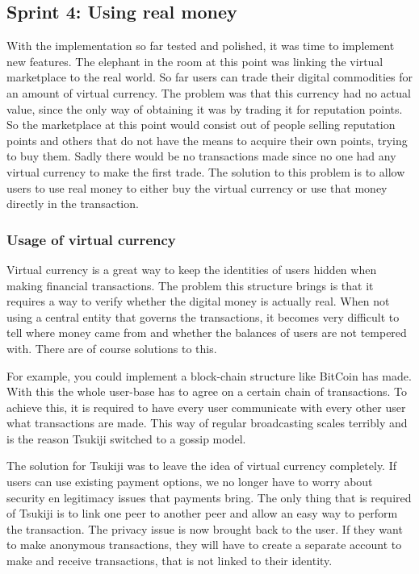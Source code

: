 \subsection{Sprint 4: Using real money}
With the implementation so far tested and polished, it was time to implement new features. 
The elephant in the room at this point was linking the virtual marketplace to the real world.
So far users can trade their digital commodities for an amount of virtual currency.
The problem was that this currency had no actual value, since the only way of obtaining it was by trading it for reputation points.
So the marketplace at this point would consist out of people selling reputation points and others that do not have the means to acquire their own points, trying to buy them.
Sadly there would be no transactions made since no one had any virtual currency to make the first trade.
The solution to this problem is to allow users to use real money to either buy the virtual currency or use that money directly in the transaction.
\subsubsection{Usage of virtual currency}
Virtual currency is a great way to keep the identities of users hidden when making financial transactions. 
The problem this structure brings is that it requires a way to verify whether the digital money is actually real. 
When not using a central entity that governs the transactions, it becomes very difficult to tell where money came from and whether the balances of users are not tempered with.
There are of course solutions to this.

For example, you could implement a block-chain structure like BitCoin has made.
With this the whole user-base has to agree on a certain chain of transactions.
To achieve this, it is required to have every user communicate with every other user what transactions are made.
This way of regular broadcasting scales terribly and is the reason Tsukiji switched to a gossip model.

The solution for Tsukiji was to leave the idea of virtual currency completely. 
If users can use existing payment options, we no longer have to worry about security en legitimacy issues that payments bring.
The only thing that is required of Tsukiji is to link one peer to another peer and allow an easy way to perform the transaction.
The privacy issue is now brought back to the user. 
If they want to make anonymous transactions, they will have to create a separate account to make and receive transactions, that is not linked to their identity. 

